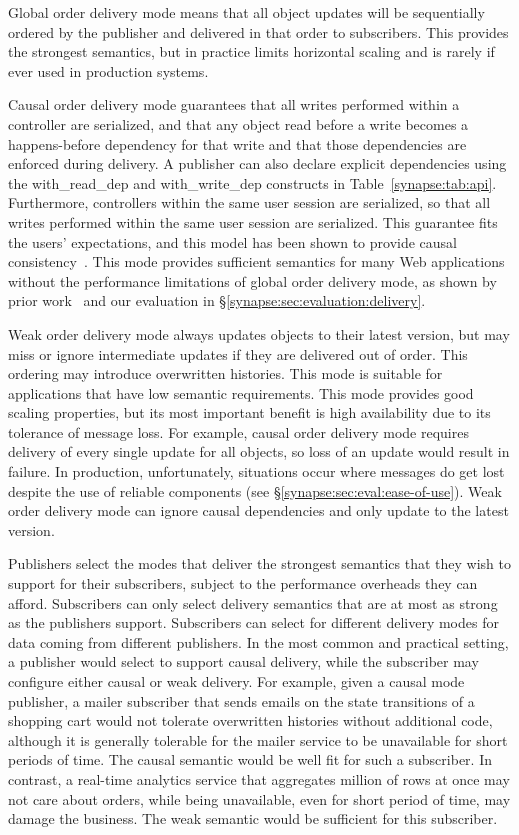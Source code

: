 Global order delivery mode means that all object updates will be
sequentially ordered by the publisher and delivered in that order to
subscribers.  This provides the strongest semantics, but
in practice limits horizontal scaling and is rarely if ever used in
production systems.  

Causal order delivery mode guarantees that all writes performed within
a controller are serialized, and that any object read before a write
becomes a happens-before dependency for that write and that those
dependencies are enforced during delivery.  A publisher can also
declare explicit dependencies using the {\code with\_read\_dep} and
{\code with\_write\_dep} constructs in Table~\ref{synapse:tab:api}.
Furthermore, controllers within the same user session are serialized,
so that all writes performed within the same user session are
serialized.  This guarantee fits the users' expectations, and this
model has been shown to provide causal
consistency~\cite{BSW2004,bolton}.
This mode provides sufficient semantics for many Web applications without the
performance limitations of global order delivery mode, as shown by prior
work~\cite{mahajan11cacTR,cops,eiger} and our evaluation in
\S\ref{synapse:sec:evaluation:delivery}.

Weak order delivery mode always updates objects to their latest
version, but may miss or ignore intermediate updates if they are
delivered out of order.  This ordering may introduce overwritten
histories.  This mode is suitable for applications that have low
semantic requirements.  This mode provides good scaling properties,
but its most important benefit is high availability due to its
tolerance of message loss.  For example, causal order delivery mode
requires delivery of every single update for all objects, so loss
of an update would result in failure.  In production, unfortunately,
situations occur where messages do get lost despite the use of
reliable components (see \S\ref{synapse:sec:eval:ease-of-use}).  Weak
order delivery mode can ignore causal dependencies and only update
to the latest version.

Publishers select the modes that deliver the strongest semantics that
they wish to support for their subscribers, subject to the performance
overheads they can afford.  Subscribers can only select delivery
semantics that are at most as strong as the publishers support.
Subscribers can select for different delivery modes for data coming
from different publishers.  In the most common and practical setting,
a publisher would select to support causal delivery, while the
subscriber may configure either causal or weak delivery. For example,
given a causal mode publisher, a mailer subscriber that sends emails
on the state transitions of a shopping cart would not tolerate
overwritten histories without additional code, although it is
generally tolerable for the mailer service to be unavailable for short
periods of time. The causal semantic would be well fit for
such a subscriber.  In contrast, a real-time analytics service that
aggregates million of rows at once may not care about orders, while
being unavailable, even for short period of time, may damage the
business.  The weak semantic would be sufficient for this subscriber.

